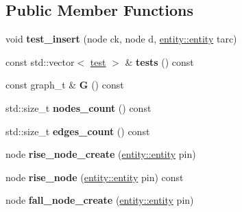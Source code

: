 \subsection*{Public Member Functions}
\begin{DoxyCompactItemize}
\item 
\hypertarget{classophidian_1_1timing_1_1graph_a8963cf5d9fe34d65f5c1cad96b9afb42}{void {\bfseries test\-\_\-insert} (node ck, node d, \hyperlink{classophidian_1_1entity_1_1entity}{entity\-::entity} tarc)}\label{classophidian_1_1timing_1_1graph_a8963cf5d9fe34d65f5c1cad96b9afb42}

\item 
\hypertarget{classophidian_1_1timing_1_1graph_af75b137f9e0d054b63d161dd5775059a}{const std\-::vector$<$ \hyperlink{structophidian_1_1timing_1_1test}{test} $>$ \& {\bfseries tests} () const }\label{classophidian_1_1timing_1_1graph_af75b137f9e0d054b63d161dd5775059a}

\item 
\hypertarget{classophidian_1_1timing_1_1graph_a4dc7bafe73cbd78f86fc2948fbd058cd}{const graph\-\_\-t \& {\bfseries G} () const }\label{classophidian_1_1timing_1_1graph_a4dc7bafe73cbd78f86fc2948fbd058cd}

\item 
\hypertarget{classophidian_1_1timing_1_1graph_a62e7abd9da49e8a6c0d1e6bffcc30feb}{std\-::size\-\_\-t {\bfseries nodes\-\_\-count} () const }\label{classophidian_1_1timing_1_1graph_a62e7abd9da49e8a6c0d1e6bffcc30feb}

\item 
\hypertarget{classophidian_1_1timing_1_1graph_a069f0377f0a51df175b85b17cb69e8d2}{std\-::size\-\_\-t {\bfseries edges\-\_\-count} () const }\label{classophidian_1_1timing_1_1graph_a069f0377f0a51df175b85b17cb69e8d2}

\item 
\hypertarget{classophidian_1_1timing_1_1graph_acc068bee90197fb0c7faa35e356b6c8a}{node {\bfseries rise\-\_\-node\-\_\-create} (\hyperlink{classophidian_1_1entity_1_1entity}{entity\-::entity} pin)}\label{classophidian_1_1timing_1_1graph_acc068bee90197fb0c7faa35e356b6c8a}

\item 
\hypertarget{classophidian_1_1timing_1_1graph_ac4ca9066427069b7ee1ab061cb2a3342}{node {\bfseries rise\-\_\-node} (\hyperlink{classophidian_1_1entity_1_1entity}{entity\-::entity} pin) const }\label{classophidian_1_1timing_1_1graph_ac4ca9066427069b7ee1ab061cb2a3342}

\item 
\hypertarget{classophidian_1_1timing_1_1graph_af9f99d3939d5c0c7bb3a59148d555bd4}{node {\bfseries fall\-\_\-node\-\_\-create} (\hyperlink{classophidian_1_1entity_1_1entity}{entity\-::entity} pin)}\label{classophidian_1_1timing_1_1graph_af9f99d3939d5c0c7bb3a59148d555bd4}


\end{DoxyCompactItemize}
